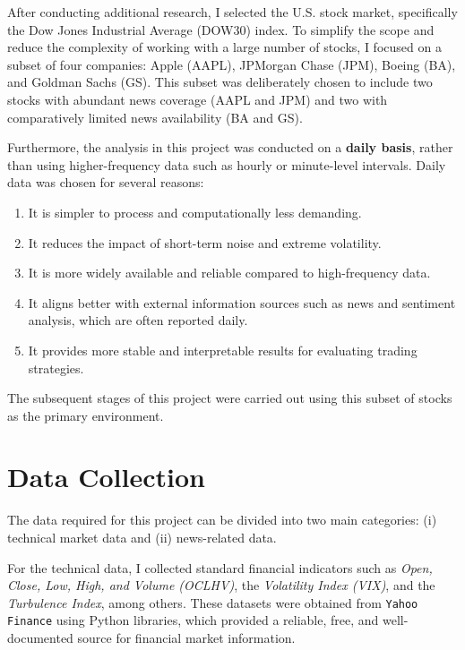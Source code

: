\documentclass[12pt,a4paper]{report}
\begin{document}
After conducting additional research, I selected the U.S. stock market, specifically the Dow Jones Industrial Average (DOW30) index. To simplify the scope and reduce the complexity of working with a large number of stocks, I focused on a subset of four companies: Apple (AAPL), JPMorgan Chase (JPM), Boeing (BA), and Goldman Sachs (GS). This subset was deliberately chosen to include two stocks with abundant news coverage (AAPL and JPM) and two with comparatively limited news availability (BA and GS). 

Furthermore, the analysis in this project was conducted on a \textbf{daily basis}, rather than using higher-frequency data such as hourly or minute-level intervals. Daily data was chosen for several reasons:

\begin{enumerate}
    \item It is simpler to process and computationally less demanding.  
    \item It reduces the impact of short-term noise and extreme volatility.  
    \item It is more widely available and reliable compared to high-frequency data.  
    \item It aligns better with external information sources such as news and sentiment analysis, which are often reported daily.  
    \item It provides more stable and interpretable results for evaluating trading strategies.  
\end{enumerate}


The subsequent stages of this project were carried out using this subset of stocks as the primary environment.


\section{Data Collection}

The data required for this project can be divided into two main categories: (i) technical market data and (ii) news-related data.  

For the technical data, I collected standard financial indicators such as \textit{Open, Close, Low, High, and Volume (OCLHV)}, the \textit{Volatility Index (VIX)}, and the \textit{Turbulence Index}, among others. These datasets were obtained from \texttt{Yahoo Finance} using Python libraries, which provided a reliable, free, and well-documented source for financial market information.  
\end{document}
